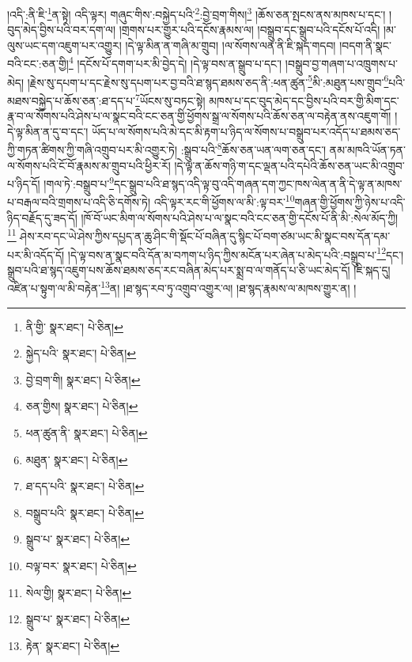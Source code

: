 །འདི་:ནི་ཇི་\footnote{ནི་གྱི་  སྣར་ཐང་།  པེ་ཅིན། }ན་སྟེ། འདི་ལྟར། གཞུང་གིས་:བསྐྱེད་པའི་\footnote{སྐྱེད་པའི་  སྣར་ཐང་།  པེ་ཅིན། }:བྱེ་བྲག་གིས།\footnote{བྱེ་བྲག་གི།  སྣར་ཐང་།  པེ་ཅིན། } །ཆོས་ཅན་སྤངས་ནས་མཁས་པ་དང་། །བུད་མེད་བྱིས་པའི་བར་དག་ལ། །གྲགས་པར་གྱུར་པའི་དངོས་རྣམས་ལ། །བསྒྲུབ་དང་སྒྲུབ་པའི་དངོས་པོ་འདི། །མ་ལུས་ཡང་དག་འཇུག་པར་འགྱུར། །དེ་ལྟ་མིན་ན་གཞི་མ་གྲུབ། །ལ་སོགས་ལན་ནི་ཇི་སྐད་གདབ། །བདག་ནི་སྣང་བའི་ངང་:ཅན་གྱི།\footnote{ཅན་གྱིས།  སྣར་ཐང་།  པེ་ཅིན། } །དངོས་པོ་དགག་པར་མི་བྱེད་དེ། །དེ་ལྟ་བས་ན་སྒྲུབ་པ་དང་། །བསྒྲུབ་བྱ་གཞག་པ་འཁྲུགས་པ་མེད། །རྗེས་སུ་དཔག་པ་དང་རྗེས་སུ་དཔག་པར་བྱ་བའི་ཐ་སྙད་ཐམས་ཅད་ནི་:ཕན་ཚུན་\footnote{ཕན་ཚུན་ནི་  སྣར་ཐང་།  པེ་ཅིན། }མི་:མཐུན་པས་གྲུབ་\footnote{མཐུན་  སྣར་ཐང་།  པེ་ཅིན། }པའི་མཐས་བསྐྱེད་པ་ཆོས་ཅན་:ཐ་དད་པ་\footnote{ཐ་དད་པའི་  སྣར་ཐང་།  པེ་ཅིན། }ཡོངས་སུ་བཏང་སྟེ། མཁས་པ་དང་བུད་མེད་དང་བྱིས་པའི་བར་གྱི་མིག་དང་རྣ་བ་ལ་སོགས་པའི་ཤེས་པ་ལ་སྣང་བའི་ངང་ཅན་གྱི་ཕྱོགས་སྒྲ་ལ་སོགས་པའི་ཆོས་ཅན་ལ་བརྟེན་ནས་འཇུག་གོ། །དེ་ལྟ་མིན་ན་དུ་བ་དང་། ཡོད་པ་ལ་སོགས་པའི་མེ་དང་མི་རྟག་པ་ཉིད་ལ་སོགས་པ་བསྒྲུབ་པར་འདོད་པ་ཐམས་ཅད་ཀྱི་གཏན་ཚིགས་ཀྱི་གཞི་འགྲུབ་པར་མི་འགྱུར་ཏེ། :སྒྲུབ་པའི་\footnote{བསྒྲུབ་པའི་  སྣར་ཐང་།  པེ་ཅིན། }ཆོས་ཅན་ཡན་ལག་ཅན་དང་། ནམ་མཁའི་ཡོན་ཏན་ལ་སོགས་པའི་ངོ་བོ་རྣམས་མ་གྲུབ་པའི་ཕྱིར་རོ། །དེ་ལྟ་ན་ཆོས་གཉི་ག་དང་ལྡན་པའི་དཔེའི་ཆོས་ཅན་ཡང་མི་འགྲུབ་པ་ཉིད་དོ། །གལ་ཏེ་:བསྒྲུབ་པ་\footnote{སྒྲུབ་པ་  སྣར་ཐང་།  པེ་ཅིན། }དང་སྒྲུབ་པའི་ཐ་སྙད་འདི་ལྟ་བུ་འདི་གཞན་དག་ཀྱང་ཁས་ལེན་ན་ནི་དེ་ལྟ་ན་མཁས་པ་བརྒལ་བའི་གྲགས་པ་འདི་ཅི་དགོས་ཏེ། འདི་ལྟར་རང་གི་ཕྱོགས་ལ་མི་:ལྟ་བར་\footnote{བལྟ་བར་  སྣར་ཐང་།  པེ་ཅིན། }གཞན་གྱི་ཕྱོགས་ཀྱི་ཉེས་པ་འདི་ཉིད་བརྗོད་དུ་ཟད་དོ། །ཁོ་བོ་ཡང་མིག་ལ་སོགས་པའི་ཤེས་པ་ལ་སྣང་བའི་ངང་ཅན་གྱི་དངོས་པོ་ནི་མི་:སེལ་མོད་ཀྱི།\footnote{སེལ་གྱི།  སྣར་ཐང་།  པེ་ཅིན། } ཤེས་རབ་དང་ཡེ་ཤེས་ཀྱིས་དཔྱད་ན་ཆུ་ཤིང་གི་སྡོང་པོ་བཞིན་དུ་སྙིང་པོ་བག་ཙམ་ཡང་མི་སྣང་བས་དོན་དམ་པར་མི་འདོད་དོ། །དེ་ལྟ་བས་ན་སྣང་བའི་དོན་མ་བཀག་པ་ཉིད་ཀྱིས་མངོན་པར་ཞེན་པ་མེད་པའི་:བསྒྲུབ་པ་\footnote{སྒྲུབ་པ་  སྣར་ཐང་།  པེ་ཅིན། }དང་། སྒྲུབ་པའི་ཐ་སྙད་འཇུག་པས་ཆོས་ཐམས་ཅད་རང་བཞིན་མེད་པར་སྨྲ་བ་ལ་གནོད་པ་ཅི་ཡང་མེད་དོ། །ཇི་སྐད་དུ། འཛིན་པ་སྟུག་ལ་མི་བརྟེན་\footnote{རྟེན་  སྣར་ཐང་།  པེ་ཅིན། }ན། །ཐ་སྙད་རབ་ཏུ་འགྲུབ་འགྱུར་ལ། །ཐ་སྙད་རྣམས་ལ་མཁས་གྱུར་ན། །
